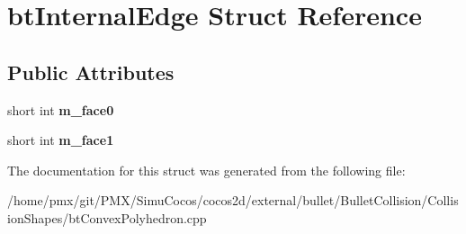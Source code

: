 \hypertarget{structbtInternalEdge}{}\section{bt\+Internal\+Edge Struct Reference}
\label{structbtInternalEdge}
\subsection*{Public Attributes}
\begin{DoxyCompactItemize}
\item 
\mbox{\label{structbtInternalEdge_a479539704a0bdb29f0889c503b8241d5}} 
short int {\bfseries m\+\_\+face0}
\item 
\mbox{\label{structbtInternalEdge_a0cd3f3af3d43c82518763932f8f54cc5}} 
short int {\bfseries m\+\_\+face1}
\end{DoxyCompactItemize}


The documentation for this struct was generated from the following file\+:\begin{DoxyCompactItemize}
\item 
/home/pmx/git/\+P\+M\+X/\+Simu\+Cocos/cocos2d/external/bullet/\+Bullet\+Collision/\+Collision\+Shapes/bt\+Convex\+Polyhedron.\+cpp\end{DoxyCompactItemize}
